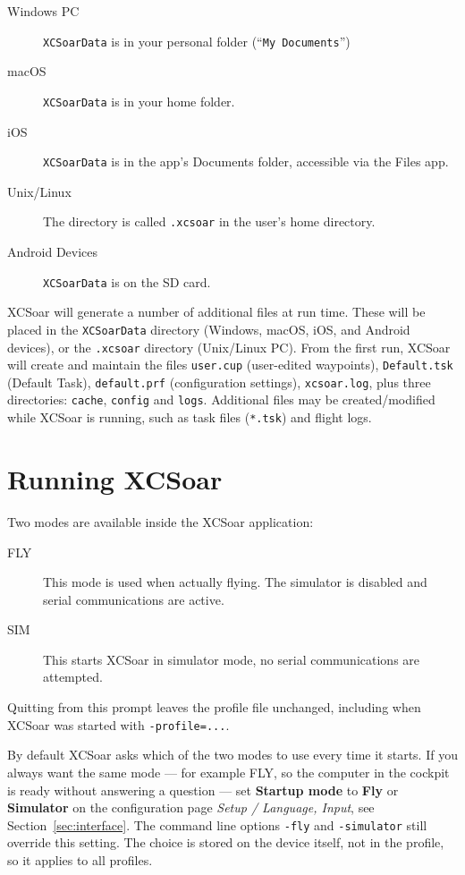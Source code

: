 \begin{description}
\item[Windows PC]
\texttt{XCSoarData} is in your personal folder (``\texttt{My
Documents}'')
\item[macOS]
\texttt{XCSoarData} is in your home folder.
\item[iOS]
\texttt{XCSoarData} is in the app's Documents folder, accessible via
the Files app.
\item[Unix/Linux]
The directory is called \verb|.xcsoar| in the user's home directory.
\item[Android Devices]
\texttt{XCSoarData} is on the SD card.
\end{description}


XCSoar will generate a number of additional files at run time.  These
will be placed in the  \texttt{XCSoarData} directory (Windows, macOS,
iOS, and Android devices), or the \texttt{.xcsoar} directory (Unix/Linux
PC).  From the first run, XCSoar will create and maintain the files
\texttt{user.cup} (user-edited waypoints),
\texttt{Default.tsk} (Default Task),  
\texttt{default.prf} 
(configuration settings),
\texttt{xcsoar.log}, 
plus three directories: \texttt{cache},
\texttt{config} and \texttt{logs}.  Additional files may be
created/modified while XCSoar is running, such as task files
(\texttt{*.tsk}) and flight logs.


\section{Running XCSoar}

Two modes are available inside the XCSoar application: 
\begin{description}
\item[FLY] This mode is used when actually flying.  The simulator is 
  disabled and serial communications are active. 
\item[SIM] This starts XCSoar in simulator mode, no serial communications
  are attempted.
\end{description}
Quitting from this prompt leaves the profile file unchanged, including
when XCSoar was started with \verb|-profile=...|.

By default XCSoar asks which of the two modes to use every time it
starts.  If you always want the same mode --- for example FLY, so the
computer in the cockpit is ready without answering a question --- set
{\bf Startup mode} to {\bf Fly} or {\bf Simulator} on the
configuration page \emph{Setup / Language, Input}, see
Section~\ref{sec:interface}.  The command line options \verb|-fly| and
\verb|-simulator| still override this setting.  The choice is stored on
the device itself, not in the profile, so it applies to all profiles.

